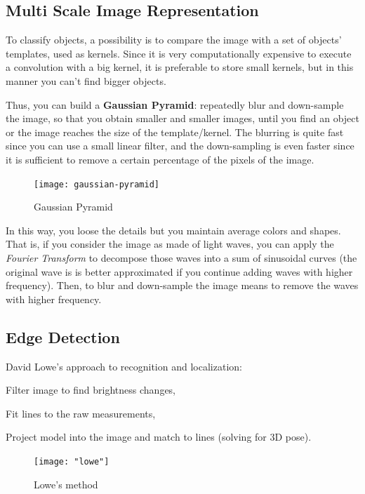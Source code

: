 \subsection{Multi Scale Image Representation}\label{sec:bif-multi-scale}

To classify objects, a possibility is to compare the image with a set of objects' templates, used as kernels. Since it is very computationally expensive to execute a convolution with a big kernel, it is preferable to store small kernels, but in this manner you can't find bigger objects.

Thus, you can build a \textbf{Gaussian Pyramid}: repeatedly blur and down-sample the image, so that you obtain smaller and smaller images, until you find an object or the image reaches the size of the template/kernel. The blurring is quite fast since you can use a small linear filter, and the down-sampling is even faster since it is sufficient to remove a certain percentage of the pixels of the image.\label{gaussian-pyramid}

\begin{figure}[!h]
    \centering
    \texttt{[image: gaussian-pyramid]}
    \caption[Gaussian Pyramid]{Gaussian Pyramid}
    \label{fig:gaussian-pyramid}
\end{figure}


In this way, you loose the details but you maintain average colors and shapes. That is, if you consider the image as made of light waves, you can apply the \textit{Fourier Transform} to decompose those waves into a sum of sinusoidal curves (the original wave is is better approximated if you continue adding waves with higher frequency).
Then, to blur and down-sample the image means to remove the waves with higher frequency.


\subsection{Edge Detection}\label{sec:bif-edge}

David Lowe's approach to recognition and localization:
\begin{myenum}
    \item Filter image to find brightness changes,
    \item Fit lines to the raw measurements,
    \item Project model into the image and match to lines (solving for 3D pose).
\end{myenum}

\begin{figure}[!h]
    \centering
    \texttt{[image: "lowe"]}
    \caption[Lowe's method]{Lowe's method}
    \label{fig:lowe}
\end{figure}

